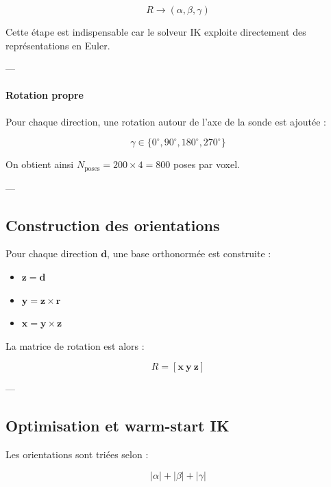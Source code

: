 \documentclass[11pt, a4paper]{article}
\begin{document}
\begin{equation}
R \rightarrow (\alpha, \beta, \gamma)
\end{equation}

Cette étape est indispensable car le solveur IK exploite directement des représentations en Euler.

---

\paragraph{Rotation propre}

Pour chaque direction, une rotation autour de l’axe de la sonde est ajoutée :

\begin{equation}
\gamma \in \{0^\circ, 90^\circ, 180^\circ, 270^\circ\}
\end{equation}

On obtient ainsi $N_{\text{poses}} = 200 \times 4 = 800$ poses par voxel.

---

\subsection{Construction des orientations}

Pour chaque direction $\mathbf{d}$, une base orthonormée est construite :

\begin{itemize}
  \item $\mathbf{z} = \mathbf{d}$
  \item $\mathbf{y} = \mathbf{z} \times \mathbf{r}$
  \item $\mathbf{x} = \mathbf{y} \times \mathbf{z}$
\end{itemize}

La matrice de rotation est alors :

\begin{equation}
R = [\mathbf{x} \ \mathbf{y} \ \mathbf{z}]
\end{equation}

---

\subsection{Optimisation et warm-start IK}

Les orientations sont triées selon :

\begin{equation}
|\alpha| + |\beta| + |\gamma|
\end{equation}
\end{document}
